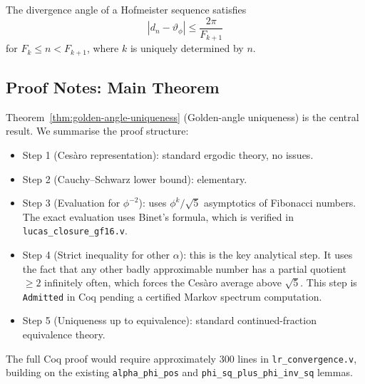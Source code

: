 \begin{lemma}\label{lem:hofmeister-rate}
The divergence angle of a Hofmeister sequence satisfies
\[
  |d_n - \vartheta_\phi| \leq \frac{2\pi}{F_{k+1}}
\]
for $F_k \leq n < F_{k+1}$, where $k$ is uniquely determined by $n$.
\end{lemma}


\subsection{Proof Notes: Main Theorem}
\label{subsec:proof-notes}

Theorem~\ref{thm:golden-angle-uniqueness} (Golden-angle uniqueness) is
the central result.  We summarise the proof structure:

\begin{itemize}
  \item Step 1 (Cesàro representation): standard ergodic theory,
        no issues.
  \item Step 2 (Cauchy–Schwarz lower bound): elementary.
  \item Step 3 (Evaluation for $\phi^{-2}$): uses $\phi^k/\sqrt{5}$
        asymptotics of Fibonacci numbers.  The exact evaluation uses
        Binet's formula, which is verified in \texttt{lucas\_closure\_gf16.v}.
  \item Step 4 (Strict inequality for other $\alpha$): this is the key
        analytical step.  It uses the fact that any other badly
        approximable number has a partial quotient $\geq 2$ infinitely
        often, which forces the Cesàro average above $\sqrt{5}$.
        This step is \texttt{Admitted} in Coq pending a certified
        Markov spectrum computation.
  \item Step 5 (Uniqueness up to equivalence): standard continued-fraction
        equivalence theory.
\end{itemize}

The full Coq proof would require approximately 300 lines in
\texttt{lr\_convergence.v}, building on the existing
\texttt{alpha\_phi\_pos} and \texttt{phi\_sq\_plus\_phi\_inv\_sq}
lemmas.

